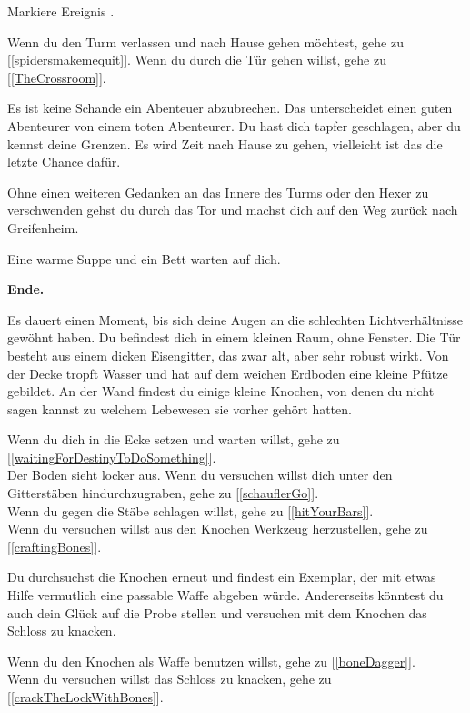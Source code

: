 Markiere Ereignis .

Wenn du den Turm verlassen und nach Hause gehen möchtest, gehe zu [\ref{spidersmakemequit}].
Wenn du durch die Tür gehen willst, gehe zu [\ref{TheCrossroom}].


Es ist keine Schande ein Abenteuer abzubrechen. Das unterscheidet einen guten Abenteurer von einem toten Abenteurer. Du hast dich tapfer geschlagen, aber du kennst deine Grenzen. Es wird Zeit nach Hause zu gehen, vielleicht ist das die letzte Chance dafür.

Ohne einen weiteren Gedanken an das Innere des Turms oder den Hexer zu verschwenden gehst du durch das Tor und machst dich auf den Weg zurück nach Greifenheim.

Eine warme Suppe und ein Bett warten auf dich.

\textbf{Ende.}


Es dauert einen Moment, bis sich deine Augen an die schlechten Lichtverhältnisse gewöhnt haben. Du befindest dich in einem kleinen Raum, ohne Fenster. Die Tür besteht aus einem dicken Eisengitter, das zwar alt, aber sehr robust wirkt. Von der Decke tropft Wasser und hat auf dem weichen Erdboden eine kleine Pfütze gebildet. An der Wand findest du einige kleine Knochen, von denen du nicht sagen kannst zu welchem Lebewesen sie vorher gehört hatten.

Wenn du dich in die Ecke setzen und warten willst, gehe zu [\ref{waitingForDestinyToDoSomething}].
\\Der Boden sieht locker aus. Wenn du versuchen willst dich unter den Gitterstäben hindurchzugraben, gehe zu [\ref{schauflerGo}].
\\Wenn du gegen die Stäbe schlagen willst, gehe zu [\ref{hitYourBars}].
\\Wenn du versuchen willst aus den Knochen Werkzeug herzustellen, gehe zu [\ref{craftingBones}].


Du durchsuchst die Knochen erneut und findest ein Exemplar, der mit etwas Hilfe vermutlich eine passable Waffe abgeben würde. Andererseits könntest du auch dein Glück auf die Probe stellen und versuchen mit dem Knochen das Schloss zu knacken.

Wenn du den Knochen als Waffe benutzen willst, gehe zu [\ref{boneDagger}].
\\Wenn du versuchen willst das Schloss zu knacken, gehe zu [\ref{crackTheLockWithBones}].

